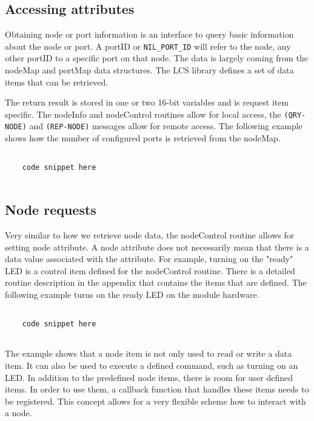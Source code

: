 \subsection{Accessing attributes}

Obtaining node or port information is an interface to query basic information about the node or port. A portID or \texttt{NIL\_PORT\_ID} will refer to the node, any other portID to a specific port on that node. The data is largely coming from the nodeMap and portMap data structures. The LCS library defines a set of data items that can be retrieved. 

The return result is stored in one or two 16-bit variables and is request item specific. The nodeInfo and nodeControl routines allow for local access, the \texttt{(QRY-NODE)} and \texttt{(REP-NODE)} messages allow for remote access. The following example shows how the number of configured ports is retrieved from the nodeMap.


\lstset{language=c++, style=codesnippetstyle}
\begin{lstlisting}
   
    code snippet here
    
\end{lstlisting}
\FloatBarrier

\subsection{Node requests}

Very similar to how we retrieve node data, the nodeControl routine allows for setting node attribute. A node attribute does not necessarily mean that there is a data value associated with the attribute. For example, turning on the "ready" LED is a control item defined for the nodeControl routine. There is a detailed routine description in the appendix that contains the items that are defined. The following example turns on the ready LED on the module hardware.

\lstset{language=c++, style=codesnippetstyle}
\begin{lstlisting}
   
    code snippet here
    
\end{lstlisting}
\FloatBarrier

The example shows that a node item is not only used to read or write a data item. It can also be used to execute a defined command, such as turning on an LED. In addition to the predefined node items, there is room for user defined items. In order to use them, a callback function that handles these items needs to be registered. This concept allows for a very flexible scheme how to interact with a node.

